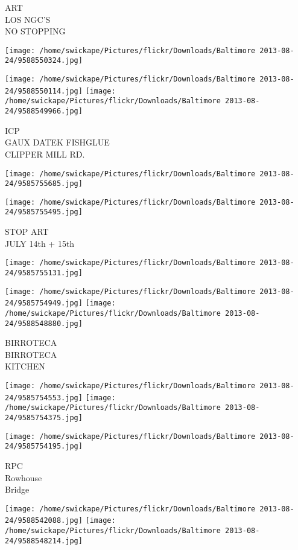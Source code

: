 \documentclass[10pt,letterpaper]{article}
\begin{document}
ART\\
LOS NGC'S\\
NO STOPPING
\pagebreak

\texttt{[image: /home/swickape/Pictures/flickr/Downloads/Baltimore 2013-08-24/9588550324.jpg]}

\vspace{0.25in}
\texttt{[image: /home/swickape/Pictures/flickr/Downloads/Baltimore 2013-08-24/9588550114.jpg]}
\texttt{[image: /home/swickape/Pictures/flickr/Downloads/Baltimore 2013-08-24/9588549966.jpg]}

ICP\\
GAUX DATEK FISHGLUE\\
CLIPPER MILL RD.
\pagebreak

\texttt{[image: /home/swickape/Pictures/flickr/Downloads/Baltimore 2013-08-24/9585755685.jpg]}

\vspace{0.25in}
\texttt{[image: /home/swickape/Pictures/flickr/Downloads/Baltimore 2013-08-24/9585755495.jpg]}

STOP ART\\
JULY 14th + 15th
\pagebreak

\texttt{[image: /home/swickape/Pictures/flickr/Downloads/Baltimore 2013-08-24/9585755131.jpg]}

\vspace{0.25in}
\texttt{[image: /home/swickape/Pictures/flickr/Downloads/Baltimore 2013-08-24/9585754949.jpg]}
\texttt{[image: /home/swickape/Pictures/flickr/Downloads/Baltimore 2013-08-24/9588548880.jpg]}

BIRROTECA\\
BIRROTECA\\
KITCHEN
\pagebreak

\texttt{[image: /home/swickape/Pictures/flickr/Downloads/Baltimore 2013-08-24/9585754553.jpg]}
\texttt{[image: /home/swickape/Pictures/flickr/Downloads/Baltimore 2013-08-24/9585754375.jpg]}

\vspace{0.25in}
\texttt{[image: /home/swickape/Pictures/flickr/Downloads/Baltimore 2013-08-24/9585754195.jpg]}

RPC\\
Rowhouse\\
Bridge
\pagebreak

\texttt{[image: /home/swickape/Pictures/flickr/Downloads/Baltimore 2013-08-24/9588542088.jpg]}
\texttt{[image: /home/swickape/Pictures/flickr/Downloads/Baltimore 2013-08-24/9588548214.jpg]}
\end{document}

